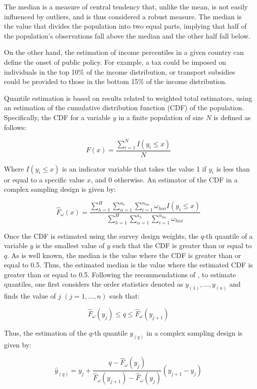 \documentclass[
  12pt,
]{book}
\begin{document}
The median is a measure of central tendency that, unlike the mean, is not easily influenced by outliers, and is thus considered a robust measure. The median is the value that divides the population into two equal parts, implying that half of the population's observations fall above the median and the other half fall below.

On the other hand, the estimation of income percentiles in a given country can define the onset of public policy. For example, a tax could be imposed on individuals in the top 10\% of the income distribution, or transport subsidies could be provided to those in the bottom 15\% of the income distribution.

Quantile estimation is based on results related to weighted total estimators, using an estimation of the cumulative distribution function (CDF) of the population. Specifically, the CDF for a variable \(y\) in a finite population of size \(N\) is defined as follows:

\[
F\left(x\right) = \frac{{ \sum_{i=1}^{N}}I\left(y_{i}\leq x\right)}{N}
\]

Where \(I\left(y_{i}\leq x\right)\) is an indicator variable that takes the value 1 if \(y_{i}\) is less than or equal to a specific value \(x\), and 0 otherwise. An estimator of the CDF in a complex sampling design is given by:

\[
\hat{F}_{\omega}\left(x\right) = \frac{\sum_{h=1}^{H}\sum_{\alpha=1}^{a_{h}}\sum_{i=1}^{n_{h\alpha}}\omega_{h\alpha i}I\left(y_{i}\leq x\right)}{\sum_{h=1}^{H}\sum_{\alpha=1}^{a_{h}}\sum_{i=1}^{n_{h\alpha}}\omega_{h\alpha i}}
\]

Once the CDF is estimated using the survey design weights, the \(q\)-th quantile of a variable \(y\) is the smallest value of \(y\) such that the CDF is greater than or equal to \(q\). As is well known, the median is the value where the CDF is greater than or equal to 0.5. Thus, the estimated median is the value where the estimated CDF is greater than or equal to 0.5. Following the recommendations of \citet{Heeringa_West_Berglund_2017}, to estimate quantiles, one first considers the order statistics denoted as \(y_{(1)},\ldots,y_{(n)}\) and finds the value of \(j\) \((j=1,\ldots,n)\) such that:

\[
\hat{F}_{\omega}\left(y_{j}\right)\leq q\leq\hat{F}_{\omega}\left(y_{j+1}\right)
\]

Thus, the estimation of the \(q\)-th quantile \(y_{(q)}\) in a complex sampling design is given by:

\[
\hat{y}_{(q)} = y_{j}+\frac{q-\hat{F}_{\omega}\left(y_{j}\right)}{\hat{F}_{\omega}\left(y_{j+1}\right)-\hat{F}_{\omega}\left(y_{j}\right)}\left(y_{j+1}-y_{j}\right)
\]
\end{document}
